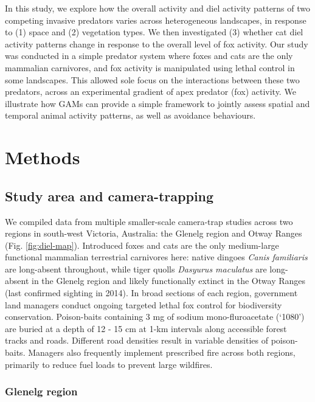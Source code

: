 \documentclass[11pt,a4paper,titlepage,twoside,openright]{style/unimelbthesis}
\begin{document}
\begin{mainmatter}
In this study, we explore how the overall activity and diel activity patterns of two competing invasive predators varies across heterogeneous landscapes, in response to (1) space and (2) vegetation types. We then investigated (3) whether cat diel activity patterns change in response to the overall level of fox activity. Our study was conducted in a simple predator system where foxes and cats are the only mammalian carnivores, and fox activity is manipulated using lethal control in some landscapes. This allowed sole focus on the interactions between these two predators, across an experimental gradient of apex predator (fox) activity. We illustrate how GAMs can provide a simple framework to jointly assess spatial and temporal animal activity patterns, as well as avoidance behaviours.

\newpage

\hypertarget{methods-3}{%
\section{Methods}\label{methods-3}}

\hypertarget{study-area-and-camera-trapping}{%
\subsection{Study area and camera-trapping}\label{study-area-and-camera-trapping}}

We compiled data from multiple smaller-scale camera-trap studies across two regions in south-west Victoria, Australia: the Glenelg region and Otway Ranges (Fig. \ref{fig:diel-map}). Introduced foxes and cats are the only medium-large functional mammalian terrestrial carnivores here: native dingoes \emph{Canis familiaris} are long-absent throughout, while tiger quolls \emph{Dasyurus maculatus} are long-absent in the Glenelg region and likely functionally extinct in the Otway Ranges (last confirmed sighting in 2014). In broad sections of each region, government land managers conduct ongoing targeted lethal fox control for biodiversity conservation. Poison-baits containing 3 mg of sodium mono-fluroacetate (`1080') are buried at a depth of 12 - 15 cm at 1-km intervals along accessible forest tracks and roads. Different road densities result in variable densities of poison-baits. Managers also frequently implement prescribed fire across both regions, primarily to reduce fuel loads to prevent large wildfires.

\hypertarget{glenelg-region-2}{%
\subsubsection{Glenelg region}\label{glenelg-region-2}}


\end{mainmatter}
\end{document}

